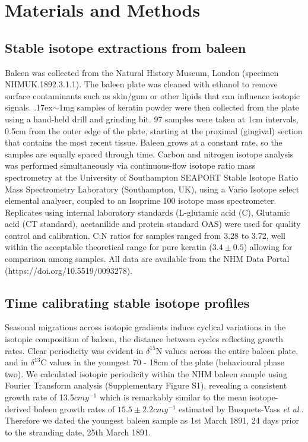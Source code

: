 \documentclass[a4paper,12pt]{article}
\begin{document}
\section{Materials and Methods}\label{methods}

\subsection{Stable isotope extractions from baleen}\label{stable-isotope-extractions-from-baleen}

Baleen was collected from the Natural History Museum, London (specimen NHMUK.1892.3.1.1). 
The baleen plate was cleaned with ethanol to remove surface contaminants such as skin/gum or other lipids that can influence isotopic signals. 
{\raise.17ex\hbox{$\scriptstyle\sim$}}1mg samples of keratin powder were then collected from the plate using a hand-held drill and grinding bit. 
97 samples were taken at 1cm intervals, 0.5cm from the outer edge of the plate, starting at the proximal (gingival) section that contains the most recent tissue. 
Baleen grows at a constant rate, so the samples are equally spaced through time\cite{best1996stable}. 
Carbon and nitrogen isotope analysis was performed simultaneously via continuous-flow isotope ratio mass spectrometry at the University of Southampton SEAPORT Stable Isotope Ratio Mass Spectrometry Laboratory (Southampton, UK), using a Vario Isotope select elemental analyser, coupled to an Isoprime 100 isotope mass spectrometer. 
Replicates using internal laboratory standards (L-glutamic acid (C), Glutamic acid (CT standard), acetanilide and protein standard OAS) were used for quality control and calibration. 
C:N ratios for samples ranged from 3.28\text{\textperthousand} to 3.72\text{\textperthousand}, well within the acceptable theoretical range for pure keratin ($3.4\pm0.5$) allowing for comparison among samples\cite{hobson1998stable}. 
All data are available from the NHM Data Portal\cite{data-set} (https://doi.org/10.5519/0093278).

\subsection{Time calibrating stable isotope
profiles}\label{time-calibrating-stable-isotope-profiles}

Seasonal migrations across isotopic gradients induce cyclical variations in the isotopic composition of baleen, the distance between cycles reflecting growth rates\cite{hobson1998stable,busquets2017estimating}. 
Clear periodicity was evident in $\delta^{15}$N values across the entire baleen plate, and in $\delta^{13}$C values in the youngest 70 - 18cm of the plate (behavioural phase two). 
We calculated isotopic periodicity within the NHM baleen sample using Fourier Transform analysis\cite{cardona2017temporal} (Supplementary Figure S1), revealing a consistent growth rate of 13.5$cmy^{-1}$ which is remarkably similar to the mean isotope-derived baleen growth rates of $15.5 \pm 2.2cmy^{-1}$ estimated by Busquets-Vass \textit{et al.}\cite{busquets2017estimating}.  
Therefore we dated the youngest baleen sample as 1st March 1891, 24 days prior to the stranding date, 25th March 1891. 
\end{document}
